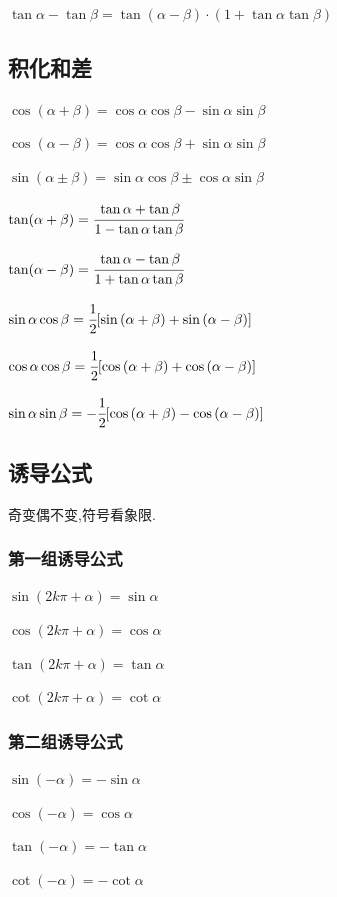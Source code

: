\documentclass[UTF8,12pt]{ctexbook}
\begin{document}
{{{  $\tan\alpha - \tan\beta = \tan(\alpha - \beta) \cdot (1 + \tan\alpha\tan\beta)$
}%

\subsection{积化和差}{
  $\cos(\alpha + \beta) = \cos{\alpha}\cos{\beta} - \sin{\alpha}\sin{\beta}$

  $\cos(\alpha - \beta) = \cos{\alpha}\cos{\beta} + \sin{\alpha}\sin{\beta}$

  $\sin(\alpha \pm \beta) = \sin{\alpha}\cos{\beta} \pm \cos{\alpha}\sin{\beta}$

  $\tan(\alpha + \beta) = \cfrac{\tan\alpha + \tan\beta}{1 - \tan\alpha\tan\beta}$

  $\tan(\alpha - \beta) = \cfrac{\tan\alpha - \tan\beta}{1 + \tan\alpha\tan\beta}$

  $\sin{\alpha}\cos{\beta} = \cfrac{1}{2}[\sin{(\alpha + \beta)} + \sin{(\alpha - \beta)}]$

  $\cos{\alpha}\cos{\beta} = \cfrac{1}{2}[\cos{(\alpha + \beta)} + \cos{(\alpha - \beta)}]$

  $\sin{\alpha}\sin{\beta} = -\cfrac{1}{2}[\cos{(\alpha + \beta)} - \cos{(\alpha - \beta)}]$
}%

\subsection{诱导公式}{
  \indent 奇变偶不变,符号看象限.
  \subsubsection{第一组诱导公式}{
    $\sin{(2k\pi + \alpha)} = \sin{\alpha}$

    $\cos{(2k\pi + \alpha)} = \cos{\alpha}$

    $\tan(2k\pi + \alpha) = \tan\alpha$

    $\cot(2k\pi + \alpha) = \cot\alpha$
  }%

  \subsubsection{第二组诱导公式}{
    $\sin(-\alpha) = -\sin\alpha$

    $\cos(-\alpha) = \cos\alpha$

    $\tan(-\alpha) = -\tan\alpha$

    $\cot(-\alpha) = -\cot\alpha$
  }%

}}}
\end{document}
